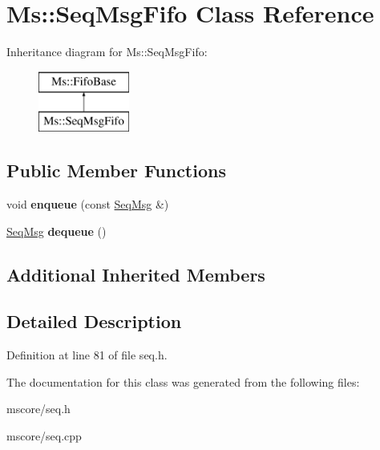 \hypertarget{class_ms_1_1_seq_msg_fifo}{}\section{Ms\+:\+:Seq\+Msg\+Fifo Class Reference}
\label{class_ms_1_1_seq_msg_fifo}
Inheritance diagram for Ms\+:\+:Seq\+Msg\+Fifo\+:\begin{figure}[H]
\begin{center}
\leavevmode
\includegraphics[height=2.000000cm]{class_ms_1_1_seq_msg_fifo}
\end{center}
\end{figure}
\subsection*{Public Member Functions}
\begin{DoxyCompactItemize}
\item 
\mbox{\label{class_ms_1_1_seq_msg_fifo_a6b7a10e85a9f0ee8771bc3f989669310}} 
void {\bfseries enqueue} (const \hyperlink{struct_ms_1_1_seq_msg}{Seq\+Msg} \&)
\item 
\mbox{\label{class_ms_1_1_seq_msg_fifo_a8b66a4d9dc5fdc91f7fd1c6270685e65}} 
\hyperlink{struct_ms_1_1_seq_msg}{Seq\+Msg} {\bfseries dequeue} ()
\end{DoxyCompactItemize}
\subsection*{Additional Inherited Members}


\subsection{Detailed Description}


Definition at line 81 of file seq.\+h.



The documentation for this class was generated from the following files\+:\begin{DoxyCompactItemize}
\item 
mscore/seq.\+h\item 
mscore/seq.\+cpp\end{DoxyCompactItemize}

